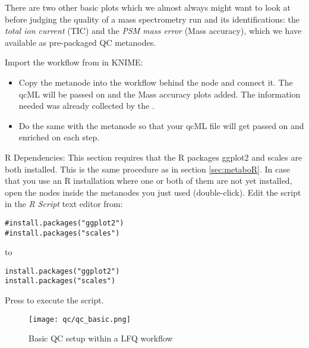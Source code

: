 There are two other basic plots which we almost always might want to look at before judging the quality of a mass spectrometry run and its identifications: the \textit{total ion current} (TIC) and the \textit{PSM mass error} (Mass accuracy), which we have available as pre-packaged QC metanodes.
\begin{task}
Import the workflow from  in KNIME: 
\end{task}
\begin{itemize}
\item Copy the  metanode into the workflow behind the  node and connect it. The qcML will be passed on and the Mass accuracy plots added. The information needed was already collected by the .
\item Do the same with the  metanode so that your qcML file will get passed on and enriched on each step. 
\end{itemize}

R Dependencies: This section requires that the R packages ggplot2 and scales are both installed. This is the same procedure as in section \ref{sec:metaboR}. In case that you use an R installation where one or both of them are not yet installed, open the  nodes inside the metanodes you just used (double-click). Edit the script in the \textit{R Script} text editor from:\\

\begin{listing}
\begin{verbatim}
#install.packages("ggplot2")
#install.packages("scales")
\end{verbatim}
\end{listing}
to 
\begin{listing}
\begin{verbatim}
install.packages("ggplot2")
install.packages("scales")
\end{verbatim}
\end{listing}
Press  to execute the script.\newline

\vspace{1cm}

\begin{figure}[htbp]
  \centering
  \texttt{[image: qc/qc\_basic.png]}
  \caption{Basic QC setup within a LFQ workflow}
  \label{fig:qc_basic}
\end{figure}

